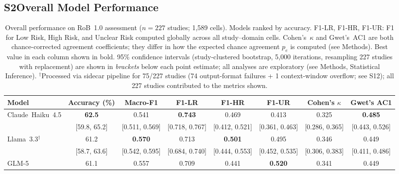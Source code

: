 \documentclass[../main.tex]{subfiles}
\begin{document}
\subsection*{S2\quad Overall Model Performance}
\label{sec:si-overall}

\begin{table}
\centering
\caption{Overall performance on RoB~1.0 assessment ($n = 227$ studies;
1{,}589 cells). Models ranked by accuracy.
F1-LR, F1-HR, F1-UR: F1 for Low Risk, High Risk, and Unclear Risk computed
globally across all study--domain cells.
Cohen's~$\kappa$ and Gwet's~AC1 are both chance-corrected agreement
coefficients; they differ in how the expected chance agreement $p_e$ is
computed (see Methods).
Best value in each column shown in bold.
95\% confidence intervals (study-clustered bootstrap, 5{,}000 iterations,
resampling 227 studies with replacement) are shown in \textit{brackets} below
each point estimate; all analyses are exploratory (see Methods, Statistical
Inference).
$^\dag$Processed via sidecar pipeline for 75/227 studies (74 output-format failures
+ 1 context-window overflow; see S12); all 227 studies contributed to the metrics shown.}
\label{tab:overall}
\begin{tabular}{lccccccc}
\toprule
Model & Accuracy (\%) & Macro-F1 & F1-LR & F1-HR & F1-UR & Cohen's $\kappa$ & Gwet's AC1 \\
\midrule
Claude~Haiku~4.5   & \textbf{62.5}   & 0.541           & \textbf{0.743}  & 0.469           & 0.413           & 0.325           & \textbf{0.485}  \\
                   & \footnotesize[59.8, 65.2] & \footnotesize[0.511, 0.569] & \footnotesize[0.718, 0.767] & \footnotesize[0.412, 0.521] & \footnotesize[0.361, 0.463] & \footnotesize[0.286, 0.365] & \footnotesize[0.443, 0.526] \\
\addlinespace[3pt]
Llama~3.3$^\dag$ & 61.2          & \textbf{0.570}  & 0.713           & \textbf{0.501}  & 0.495           & 0.346           & 0.449           \\
                   & \footnotesize[58.7, 63.6] & \footnotesize[0.542, 0.595] & \footnotesize[0.684, 0.740] & \footnotesize[0.444, 0.553] & \footnotesize[0.452, 0.535] & \footnotesize[0.306, 0.383] & \footnotesize[0.411, 0.486] \\
\addlinespace[3pt]
GLM-5              & 61.1            & 0.557           & 0.709           & 0.441           & \textbf{0.520}  & 0.341           & 0.449           \\

\end{tabular}
\end{table}
\end{document}
